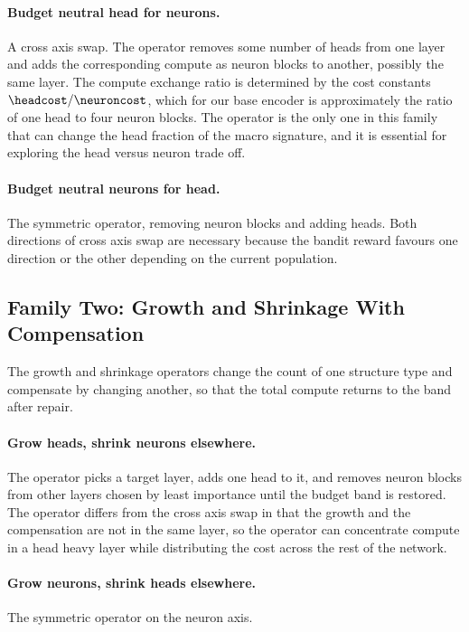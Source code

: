 \paragraph{Budget neutral head for neurons.} A cross axis swap. The operator removes some number of heads from one layer and adds the corresponding compute as neuron blocks to another, possibly the same layer. The compute exchange ratio is determined by the cost constants $\headcost / \neuroncost$, which for our base encoder is approximately the ratio of one head to four neuron blocks. The operator is the only one in this family that can change the head fraction of the macro signature, and it is essential for exploring the head versus neuron trade off.

\paragraph{Budget neutral neurons for head.} The symmetric operator, removing neuron blocks and adding heads. Both directions of cross axis swap are necessary because the bandit reward favours one direction or the other depending on the current population.

\subsection{Family Two: Growth and Shrinkage With Compensation}

The growth and shrinkage operators change the count of one structure type and compensate by changing another, so that the total compute returns to the band after repair.

\paragraph{Grow heads, shrink neurons elsewhere.} The operator picks a target layer, adds one head to it, and removes neuron blocks from other layers chosen by least importance until the budget band is restored. The operator differs from the cross axis swap in that the growth and the compensation are not in the same layer, so the operator can concentrate compute in a head heavy layer while distributing the cost across the rest of the network.

\paragraph{Grow neurons, shrink heads elsewhere.} The symmetric operator on the neuron axis.

